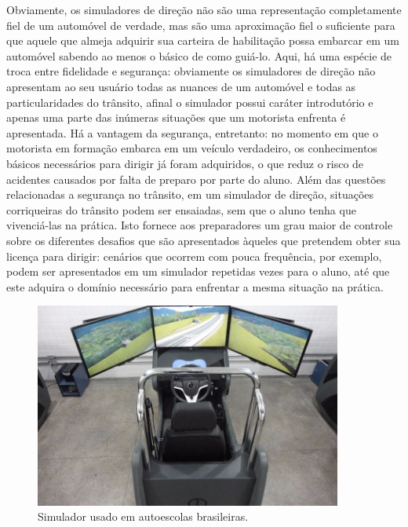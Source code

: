 \documentclass[cic,tc]{iiufrgs}
\begin{document}
Obviamente, os simuladores de direção não são uma representação completamente
fiel de um automóvel de verdade, mas são uma aproximação fiel o suficiente para
que aquele que almeja adquirir sua carteira de habilitação possa embarcar em um
automóvel sabendo ao menos o básico de como guiá-lo. Aqui, há uma espécie de
troca entre fidelidade e segurança: obviamente os simuladores de direção não
apresentam ao seu usuário todas as nuances de um automóvel e todas as
particularidades do trânsito, afinal o simulador possui caráter introdutório e
apenas uma parte das inúmeras situações que um motorista enfrenta é apresentada.
Há a vantagem da segurança, entretanto: no momento em que o motorista em
formação embarca em um veículo verdadeiro, os conhecimentos básicos necessários
para dirigir já foram adquiridos, o que reduz o risco de acidentes causados por
falta de preparo por parte do aluno. Além das questões relacionadas a segurança
no trânsito, em um simulador de direção, situações corriqueiras do trânsito
podem ser ensaiadas, sem que o aluno tenha que vivenciá-las na prática. Isto
fornece aos preparadores um grau maior de controle sobre os diferentes desafios
que são apresentados àqueles que pretendem obter sua licença para dirigir:
cenários que ocorrem com pouca frequência, por exemplo, podem ser apresentados
em um simulador repetidas vezes para o aluno, até que este adquira o domínio
necessário para enfrentar a mesma situação na prática.

\begin{figure}[h]
    \caption{Simulador usado em autoescolas brasileiras.}
    \begin{center}
      \includegraphics[width=0.9\textwidth]{simuladorautoescola.jpg}
    \end{center}
    \label{fig:simuladorautoescola}
\end{figure}
\end{document}
